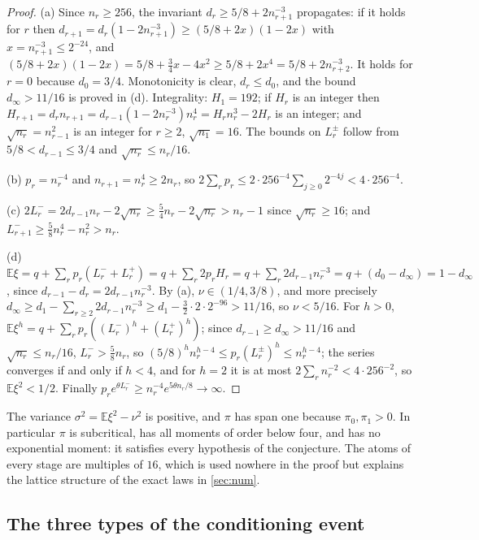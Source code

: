 \documentclass[11pt]{amsart}
\theoremstyle{definition}
\newcommand{\E}{\mathbb{E}}
\begin{document}
\begin{proof}
(a) Since $n_r\ge256$, the invariant $d_r\ge5/8+2n_{r+1}^{-3}$ propagates: if it holds for $r$ then $d_{r+1}=d_r(1-2n_{r+1}^{-3})\ge(5/8+2x)(1-2x)$ with $x=n_{r+1}^{-3}\le2^{-24}$, and $(5/8+2x)(1-2x)=5/8+\tfrac34x-4x^2\ge5/8+2x^4=5/8+2n_{r+2}^{-3}$. It holds for $r=0$ because $d_0=3/4$. Monotonicity is clear, $d_r\le d_0$, and the bound $d_\infty>11/16$ is proved in (d). Integrality: $H_1=192$; if $H_r$ is an integer then $H_{r+1}=d_rn_{r+1}=d_{r-1}(1-2n_r^{-3})n_r^4=H_rn_r^3-2H_r$ is an integer; and $\sqrt{n_r}=n_{r-1}^2$ is an integer for $r\ge2$, $\sqrt{n_1}=16$. The bounds on $L_r^\pm$ follow from $5/8<d_{r-1}\le3/4$ and $\sqrt{n_r}\le n_r/16$.

(b) $p_r=n_r^{-4}$ and $n_{r+1}=n_r^4\ge2n_r$, so $2\sum_rp_r\le2\cdot256^{-4}\sum_{j\ge0}2^{-4j}<4\cdot256^{-4}$.

(c) $2L_r^-=2d_{r-1}n_r-2\sqrt{n_r}\ge\tfrac54n_r-2\sqrt{n_r}>n_r-1$ since $\sqrt{n_r}\ge16$; and $L_{r+1}^-\ge\tfrac58n_r^4-n_r^2>n_r$.

(d) $\E\xi=q+\sum_rp_r(L_r^-+L_r^+)=q+\sum_r2p_rH_r=q+\sum_r2d_{r-1}n_r^{-3}=q+(d_0-d_\infty)=1-d_\infty$, since $d_{r-1}-d_r=2d_{r-1}n_r^{-3}$. By (a), $\nu\in(1/4,3/8)$, and more precisely $d_\infty\ge d_1-\sum_{r\ge2}2d_{r-1}n_r^{-3}\ge d_1-\tfrac32\cdot2\cdot2^{-96}>11/16$, so $\nu<5/16$. For $h>0$, $\E\xi^h=q+\sum_rp_r((L_r^-)^h+(L_r^+)^h)$; since $d_{r-1}\ge d_\infty>11/16$ and $\sqrt{n_r}\le n_r/16$, $L_r^->\tfrac58n_r$, so $(5/8)^hn_r^{h-4}\le p_r(L_r^\pm)^h\le n_r^{h-4}$; the series converges if and only if $h<4$, and for $h=2$ it is at most $2\sum_rn_r^{-2}<4\cdot256^{-2}$, so $\E\xi^2<1/2$. Finally $p_re^{\theta L_r^-}\ge n_r^{-4}e^{5\theta n_r/8}\to\infty$.
\end{proof}

The variance $\sigma^2=\E\xi^2-\nu^2$ is positive, and $\pi$ has span one because $\pi_0,\pi_1>0$. In particular $\pi$ is subcritical, has all moments of order below four, and has no exponential moment: it satisfies every hypothesis of the conjecture. The atoms of every stage are multiples of $16$, which is used nowhere in the proof but explains the lattice structure of the exact laws in \cref{sec:num}.

\subsection{The three types of the conditioning event}
\end{document}
